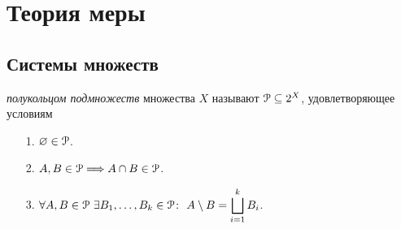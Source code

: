\chapter{Теория меры}

\section{Системы множеств}

\begin{definition}
    \textit{полукольцом подмножеств} множества $X$ называют $\mathcal{P} \subseteq 2^X$,
    удовлетворяющее условиям
    \begin{itemize}
        \item[1.] $\varnothing \in \mathcal{P}$.
        \item[2.] $A, B \in \mathcal{P} \Longrightarrow A \cap B \in \mathcal{P}$.
        \item[3.] $\displaystyle \forall A, B \in \mathcal{P}~ \exists B_1, \ldots,
        B_k \in \mathcal{P}\colon~ A \setminus B = \bigsqcup_{i = 1}^{k}{B_i}$.
    \end{itemize}
\end{definition}
